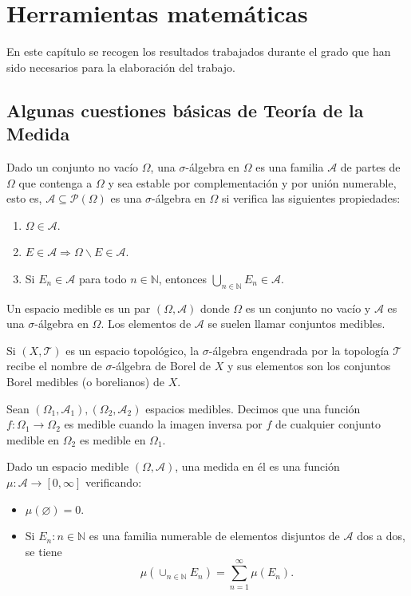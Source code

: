 \chapter{Herramientas matemáticas}\label{ch:segundo-capitulo}
En este capítulo se recogen los resultados trabajados durante el grado que han sido necesarios para la elaboración del trabajo.
\section{Algunas cuestiones básicas de Teoría de la Medida}
\begin{definicion}
Dado un conjunto no vacío $\Omega$, una $\sigma$-álgebra en $\Omega$ es una familia $\mathcal{A}$ de partes de $\Omega$ que contenga a $\Omega$ y sea estable por complementación y por unión numerable, esto es, $\mathcal{A} \subseteq \mathcal{P}(\Omega)$ es una $\sigma$-álgebra en $\Omega$ si verifica las siguientes propiedades:
\begin{enumerate}
	\item $\Omega\in\mathcal{A}$.
	\item $E\in\mathcal{A} \Rightarrow \Omega \backslash E \in \mathcal{A}$.
	\item Si $E_{n}\in\mathcal{A}$ para todo $n\in\mathds{N}$, entonces $\bigcup_{n\in\mathds{N}}E_{n}\in\mathcal{A}$.
\end{enumerate}
Un espacio medible es un par $(\Omega,\mathcal{A})$ donde $\Omega$ es un conjunto no vacío y $\mathcal{A}$ es una $\sigma$-álgebra en $\Omega$. Los elementos de $\mathcal{A}$ se suelen llamar conjuntos medibles.
\end{definicion}

\begin{definicion}
Si $(X,\mathcal{T})$ es un espacio topológico, la $\sigma$-álgebra engendrada por la topología $\mathcal{T}$ recibe el nombre de $\sigma$-álgebra de Borel de $X$ y sus elementos son los conjuntos Borel medibles (o borelianos) de $X$.
\end{definicion}

\begin{definicion}
Sean $(\Omega_{1},\mathcal{A}_{1}), (\Omega_{2},\mathcal{A}_{2})$ espacios medibles. Decimos que una función $f:\Omega_{1}\rightarrow\Omega_{2}$ es medible cuando la imagen inversa por $f$ de cualquier conjunto medible en $\Omega_{2}$ es medible en $\Omega_{1}$.
\end{definicion}

\begin{definicion}
Dado un espacio medible $(\Omega,\mathcal{A})$, una medida en él es una función $\mu:\mathcal{A}\rightarrow[0,\infty]$ verificando: 
\begin{itemize}
	\item $\mu(\varnothing)= 0 $.
	\item Si ${E_{n} : n\in \mathds{N} }$ es una familia numerable de elementos disjuntos de $\mathcal{A}$ dos a dos, se tiene $$ \mu(\cup_{n\in\mathds{N}}E_{n}) = \sum_{n=1}^{\infty} \mu(E_{n}).$$
\end{itemize}
\end{definicion}

